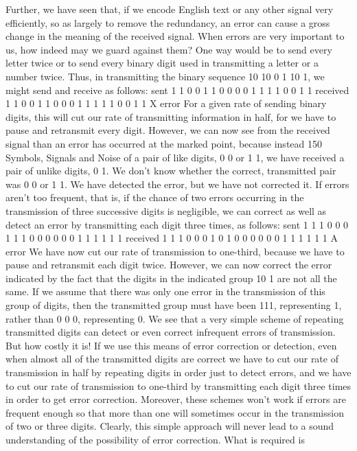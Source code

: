 {{{Further, we have seen that, if we encode English text or any other
signal very efficiently, so as largely to remove the redundancy, an
error can cause a gross change in the meaning of the received
signal.
When errors are very important to us, how indeed may we guard
against them? One way would be to send every letter twice or to
send every binary digit used in transmitting a letter or a number
twice. Thus, in transmitting the binary sequence 10 10 0 1 10 1,
we might send and receive as follows:
sent 1 1 0 0 1 1 0 0 0 0 1 1 1 1 0 0 1 1
received 1 1 0 0 1 1 0 0 0 1 1 1 1 1 0 0 1 1
X
error
For a given rate of sending binary digits, this will cut our rate of
transmitting information in half, for we have to pause and retransmit
every digit. However, we can now see from the received signal
than an error has occurred at the marked point, because instead
150
Symbols, Signals and Noise
of a pair of like digits, 0 0 or 1 1, we have received a pair of unlike
digits, 0 1. We don’t know whether the correct, transmitted pair
was 0 0 or 1 1. We have detected the error, but we have not
corrected it.
If errors aren’t too frequent, that is, if the chance of two errors
occurring in the transmission of three successive digits is negligible,
we can correct as well as detect an error by transmitting each digit
three times, as follows:
sent 1 1 1 0 0 0 1 1 1 0 0 0 0 0 0 1 1 1 1 1 1
received 1 1 1 0 0 0 1 0 1 0 0 0 0 0 0 1 1 1 1 1 1
A
error
We have now cut our rate of transmission to one-third, because we
have to pause and retransmit each digit twice. However, we can
now correct the error indicated by the fact that the digits in the
indicated group 10 1 are not all the same. If we assume that there
was only one error in the transmission of this group of digits, then
the transmitted group must have been 111, representing 1, rather
than 0 0 0, representing 0.
We see that a very simple scheme of repeating transmitted digits
can detect or even correct infrequent errors of transmission. But
how costly it is! If we use this means of error correction or detection,
even when almost all of the transmitted digits are correct we
have to cut our rate of transmission in half by repeating digits in
order just to detect errors, and we have to cut our rate of transmission
to one-third by transmitting each digit three times in order
to get error correction. Moreover, these schemes won’t work if
errors are frequent enough so that more than one will sometimes
occur in the transmission of two or three digits.
Clearly, this simple approach will never lead to a sound understanding
of the possibility of error correction. What is required is
}}}
